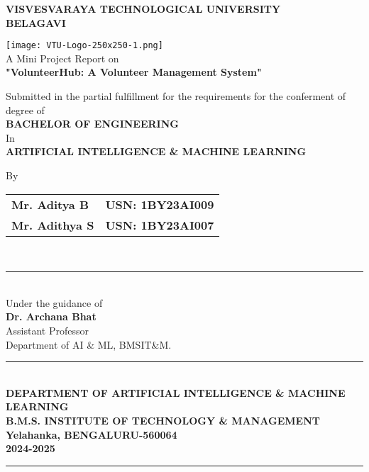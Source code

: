 \documentclass[12pt,a4paper]{report}
\begin{document}
\begin{titlepage}
    \centering
    \vspace*{-1.5cm}
    
    {\Large\textbf{VISVESVARAYA TECHNOLOGICAL UNIVERSITY}\\ \textbf{BELAGAVI}\\[0.7cm]}
    
    \texttt{[image: VTU-Logo-250x250-1.png]}\\[0.4cm]
    
    {\large A Mini Project Report on\\[0.2cm]}
    {\LARGE\textbf{"VolunteerHub: A Volunteer Management System"}\\[0.5cm]}
    
    {\normalsize Submitted in the partial fulfillment for the requirements for the conferment of degree of\\[0.2cm]}
    {\large\textbf{BACHELOR OF ENGINEERING}\\[0.2cm]}
    {\normalsize In\\[0.2cm]}
    {\large\textbf{ARTIFICIAL INTELLIGENCE \& MACHINE LEARNING}\\[0.5cm]}
    
    {\normalsize By\\[0.2cm]}
    \begin{tabular}{ll}
    \textbf{Mr. Aditya B} & \textbf{USN: 1BY23AI009} \\
    \textbf{Mr. Adithya S} & \textbf{USN: 1BY23AI007} \\
    \end{tabular}
    \\[0.6cm]
    
    \rule{0.6\textwidth}{0.5pt}\\[0.3cm]
    
    {\normalsize Under the guidance of\\[0.2cm]}
    {\normalsize\textbf{Dr. Archana Bhat}\\[0.1cm]}
    {\normalsize Assistant Professor\\[0.1cm]}
    {\normalsize Department of AI \& ML, BMSIT\&M.\\[0.8cm]}
    
    \rule{\textwidth}{1pt}\\[0.2cm]
    {\normalsize\textbf{DEPARTMENT OF ARTIFICIAL INTELLIGENCE \& MACHINE LEARNING}\\[0.1cm]}
    {\normalsize\textbf{B.M.S. INSTITUTE OF TECHNOLOGY \& MANAGEMENT}\\[0.1cm]}
    {\normalsize\textbf{Yelahanka, BENGALURU-560064}\\[0.1cm]}
    {\normalsize\textbf{2024-2025}}\\[0.2cm]
    \rule{\textwidth}{1pt}
\end{titlepage}
\end{document}
